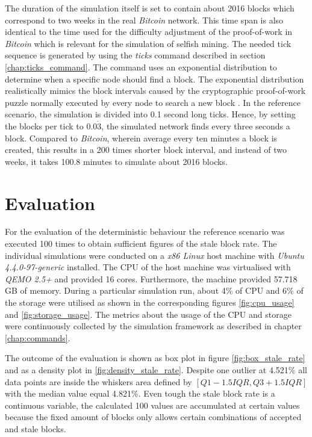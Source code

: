 The duration of the simulation itself is set to contain about 2016 blocks which correspond to two weeks in the real \textit{Bitcoin} network.
This time span is also identical to the time used for the difficulty adjustment of the proof-of-work in \textit{Bitcoin} which is relevant for the simulation of selfish mining. 
The needed tick sequence is generated by using the \textit{ticks} command described in section \ref{chap:ticks_command}.
The command uses an exponential distribution to determine when a specific node should find a block. 
The exponential distribution realistically mimics the block intervals caused by the cryptographic proof-of-work puzzle normally executed by every node to search a new block \cite{nakamoto2008bitcoin, decker2013information, eyal2014majority}.
In the reference scenario, the simulation is divided into 0.1 second long ticks.
Hence, by setting the blocks per tick to $0.0\dot{3}$, the simulated network finds every three seconds a block.
Compared to \textit{Bitcoin}, wherein average every ten minutes a block is created, this results in a 200 times shorter block interval, and instead of two weeks, it takes 100.8 minutes to simulate about 2016 blocks.

\section{Evaluation}
\label{chap:evaluation}

For the evaluation of the deterministic behaviour the reference scenario was executed 100 times to obtain sufficient figures of the stale block rate.
The individual simulations were conducted on a \textit{x86 Linux} host machine with \textit{Ubuntu 4.4.0-97-generic} installed.
The CPU of the host machine was virtualised with \textit{QEMO 2.5+} and provided 16 cores.
Furthermore, the machine provided 57.718 GB of memory.
During a particular simulation run, about 4\% of CPU and 6\% of the storage were utilised as shown in the corresponding figures \ref{fig:cpu_usage} and \ref{fig:storage_usage}.
The metrics about the usage of the CPU and storage were continuously collected by the simulation framework as described in chapter \ref{chap:commands}.

The outcome of the evaluation is shown as box plot in figure \ref{fig:box_stale_rate} and as a density plot in \ref{fig:density_stale_rate}.
Despite one outlier at 4.521\% all data points are inside the whiskers area defined by $[Q1 - 1.5IQR, Q3 + 1.5IQR]$ with the median value equal 4.821\%.
Even tough the stale block rate is a continuous variable, the calculated 100 values are accumulated at certain values because the fixed amount of blocks only allows certain combinations of accepted and stale blocks.

